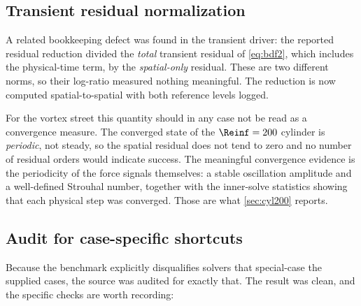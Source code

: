 \subsection{Transient residual normalization}
\label{sec:transientnorm}

A related bookkeeping defect was found in the transient driver: the reported
residual reduction divided the \emph{total} transient residual of
\cref{eq:bdf2}, which includes the physical-time term, by the \emph{spatial-only}
residual. These are two different norms, so their log-ratio measured nothing
meaningful. The reduction is now computed spatial-to-spatial with both reference
levels logged.

For the vortex street this quantity should in any case not be read as a
convergence measure. The converged state of the $\Reinf=200$ cylinder is
\emph{periodic}, not steady, so the spatial residual does not tend to zero and no
number of residual orders would indicate success. The meaningful convergence
evidence is the periodicity of the force signals themselves: a stable oscillation
amplitude and a well-defined Strouhal number, together with the inner-solve
statistics showing that each physical step was converged. Those are what
\cref{sec:cyl200} reports.

\subsection{Audit for case-specific shortcuts}
\label{sec:shortcuts}

Because the benchmark explicitly disqualifies solvers that special-case the
supplied cases, the source was audited for exactly that. The result was clean, and
the specific checks are worth recording:

